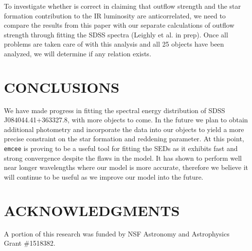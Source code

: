 To investigate whether \cite{farrah2012} is correct in claiming that outflow strength and the star formation contribution to the IR 
luminosity are anticorrelated, we need to compare the results from this paper with our separate calculations of outflow strength 
through fitting the SDSS spectra (Leighly et al. in prep). Once all problems are taken care of with this analysis and all 25 objects have been 
analyzed, we will determine if any relation exists.

\section{CONCLUSIONS}
\label{sec:conclusions}

 We have made progress in fitting the spectral energy distribution of SDSS J084044.41+363327.8, with more objects to come. In the future 
 we plan to obtain additional photometry and incorporate the data into our objects to yield a more precise constraint on the star 
 formation and reddening parameter. At this point, \texttt{emcee} is proving to be a useful tool for fitting the SEDs as it exhibits 
 fast and strong convergence despite the flaws in the model. It has shown to perform well near longer wavelengths where our model is 
 more accurate, therefore we believe it will continue to be useful as we improve our model into the future.

\section{ACKNOWLEDGMENTS}
\label{sec:acknowledgments}

A portion of this research was funded by NSF Astronomy and Astrophysics Grant \#1518382.

\newpage



